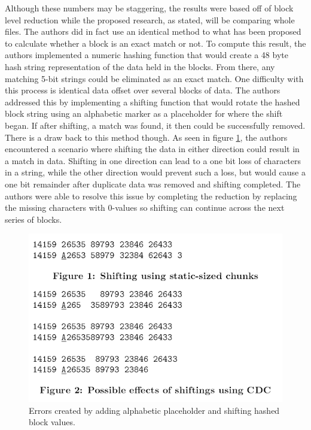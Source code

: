 \documentclass[11pt]{article}
\begin{document}
Although these numbers may be staggering, the results were based off of block level reduction while the proposed research, as stated, will be comparing whole files. The authors did in fact use an identical method to what has been proposed to calculate whether a block is an exact match or not. To compute this result, the authors implemented a numeric hashing function that would create a 48 byte hash string representation of the data held in the blocks. From there, any matching 5-bit strings could be eliminated as an exact match. One difficulty with this process is identical data offset over several blocks of data. The authors addressed this by implementing a shifting function that would rotate the hashed block string using an alphabetic marker as a placeholder for where the shift began. If after shifting, a match was found, it then could be successfully removed. There is a draw back to this method though. As seen in figure \ref{fig:shift}, the authors encountered a scenario where shifting the data in either direction could result in a match in data. Shifting in one direction can lead to a one bit loss of characters in a string, while the other direction would prevent such a loss, but would cause a one bit remainder after duplicate data was removed and shifting completed. The authors were  able to resolve this issue by completing the reduction by replacing the missing characters with 0-values so shifting can continue across the next series of blocks.

\begin{figure}
\begin{center}
\includegraphics[scale=.7]{chunk_shift}
\caption{\label{fig:shift} Errors created by adding alphabetic placeholder and shifting hashed block values.}
\end{center}
\end{figure}
\end{document}
